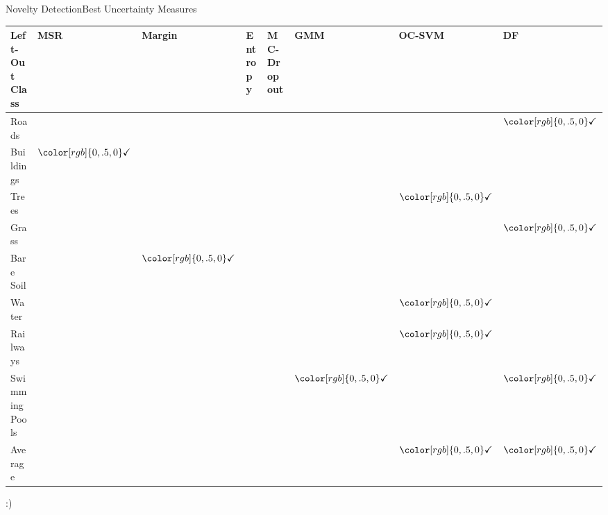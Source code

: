 \documentclass{beamer}
\begin{document}


\newcommand{\tick}{${\color[rgb]{0, .5, 0}\mathbf{\checkmark}}$}

\begin{frame}{Novelty Detection}{Best Uncertainty Measures}
	\begin{table}[H]
		\centering
		\footnotesize
		\begin{tabular}{@{}l|llll|lll@{}}
			\toprule
			Left-Out Class & MSR  & Margin     & Entropy & \gls{MC-Dropout} & \gls{GMM}     & \gls{OC-SVM}  & \gls{DF}                \\ \midrule
			Roads          &   &    &     &   &  &  &  \tick \\
			Buildings    & \tick  &    &     &   &  &  &   \\
			Trees          &   &    &     &   &  &   \tick &\\ 
			Grass          &   &    &     &   &  &  &  \tick \\ 
			Bare Soil      &   & \tick   &     &   &  &  &   \\ 
			Water          &   &    &     &   &  &  \tick &   \\ 
			Railways       &   &    &     &   &  & \tick &   \\ 
			Swimming Pools &   &    &     &   &  \tick  &  &  \tick \\ \midrule
			Average       &   &    &     &   &  &  \tick &   \tick \\ \bottomrule
		\end{tabular}
	\end{table}
	\pause
	\centering
	:)
\end{frame}
\end{document}
